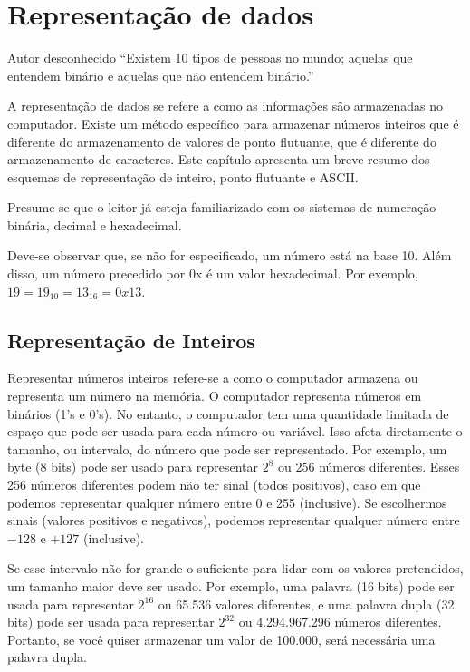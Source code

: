 \chapter{Representação de dados}
\label{cap:representacaodedados}

\begin{chapquote}{Autor desconhecido}
``Existem 10 tipos de pessoas no mundo;
aquelas que entendem binário e aquelas que
não entendem binário.''
\end{chapquote}

A representação de dados se refere a como as informações são armazenadas no computador. Existe um método específico para armazenar números inteiros que é diferente do armazenamento de valores de ponto flutuante, que é diferente do armazenamento de caracteres. Este capítulo apresenta um breve resumo dos esquemas de representação de inteiro, ponto flutuante e ASCII.

Presume-se que o leitor já esteja familiarizado com os sistemas de numeração binária, decimal e hexadecimal.

Deve-se observar que, se não for especificado, um número está na base 10. Além disso, um número precedido por 0x é um valor hexadecimal. Por exemplo, $ 19 = 19_{10}  = 13_{16} = 0x13$.

\section{Representação de Inteiros}
Representar números inteiros refere-se a como o computador armazena ou representa um número na memória. O computador representa números em binários (1's e 0's). No entanto, o computador tem uma quantidade limitada de espaço que pode ser usada para cada número ou variável.
Isso afeta diretamente o tamanho, ou intervalo, do número que pode ser representado. Por exemplo, um byte (8 bits) pode ser usado para representar $ 2^8 $ ou $ 256 $ números diferentes. Esses 256 números diferentes podem não ter sinal (todos positivos), caso em que podemos representar qualquer número entre 0 e 255 (inclusive). Se escolhermos sinais (valores positivos e negativos), podemos representar qualquer número entre $ -128 $ e $ +127 $ (inclusive).

Se esse intervalo não for grande o suficiente para lidar com os valores pretendidos, um tamanho maior deve ser usado. Por exemplo, uma palavra (16 bits) pode ser usada para representar $ 2^{16} $ ou 65.536 valores diferentes, e uma palavra dupla (32 bits) pode ser usada para representar $ 2^{32} $ ou 4.294.967.296 números diferentes. Portanto, se você quiser armazenar um valor de 100.000, será necessária uma palavra dupla.

